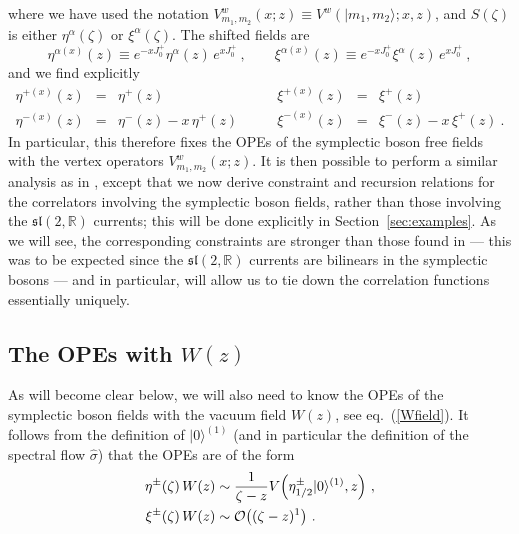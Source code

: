 \documentclass[a4paper,11pt]{article}
\numberwithin{equation}{section}
\def\be{\begin{equation}}
\def\ee{\end{equation}}
\begin{document}
where  we have used the notation $V^{w}_{m_1,m_2}(x;z) \equiv V^w(|m_1,m_2\rangle; x,z)$, and $S(\zeta)$ is either $\eta^\alpha(\zeta)$ or $\xi^\alpha(\zeta)$. The shifted fields are  
\be
\eta^{\alpha (x)}(z) \equiv e^{-x J^+_0} \eta^\alpha(z) \, e^{x J^+_0} \ , \qquad 
\xi^{\alpha (x)}(z) \equiv e^{-x J^+_0} \xi^\alpha(z) \, e^{x J^+_0} \ , 
\ee
and we find explicitly
\be
\begin{array}{rclrcl} \label{eq:xi-shifted}
\eta^{+(x)}(z) & = & \eta^+(z) \qquad 
& \xi^{+(x)}(z) & =  & \xi^+(z)  \\ 
\eta^{-(x)}(z) & = &  \eta^-(z) - x\, \eta^+(z) \qquad 
& \xi^{-(x)}(z) & = & \xi^-(z) - x\,  \xi^+(z)  \ .
\end{array}
\ee
In particular, this therefore fixes the OPEs of the symplectic boson free fields with the vertex operators $V^w_{m_1,m_2}(x;z)$. It is then possible to perform a similar analysis as in \cite{Eberhardt:2019ywk}, except that we now derive constraint and recursion relations for the correlators involving the symplectic boson fields, rather than those involving the $\mathfrak{sl}(2,\mathds{R})$ currents; this will be done explicitly in Section~\ref{sec:examples}. As we will see, the corresponding constraints are stronger than those found in \cite{Eberhardt:2019ywk} --- this was to be expected since the $\mathfrak{sl}(2,\mathds{R})$ currents are bilinears in the symplectic bosons --- and in particular, will allow us to tie down the correlation functions essentially uniquely. 

\subsection[The OPEs with \texorpdfstring{$W(z)$}{W(z)}]{\boldmath The OPEs with \texorpdfstring{$W(z)$}{W(z)}}

As will become clear below, we will also need to know the OPEs of the symplectic boson fields with the vacuum field $W(z)$, see eq.~(\ref{Wfield}). It follows from the definition of $|0\rangle^{(1)}$ (and in particular the definition of the spectral flow $\hat{\sigma}$) that the OPEs are of the form 
\begin{align}
\label{eq:wcorr}
\eta^{\pm}(\zeta) \, W(z) & \sim \frac{1}{\zeta - z} V \Bigl(\eta^\pm _{1/2} |0\rangle^{(1)} , z\Bigr)
\ , \\
\xi^\pm(\zeta) \, W(z) & \sim {\cal O} \bigl((\zeta - z)^1  \bigr)  \ . \label{OPE6}
\end{align}
\end{document}
